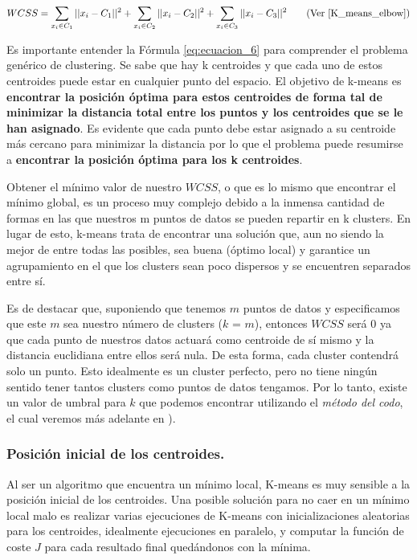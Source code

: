 \documentclass[12pt,a4paper]{article}
\begin{document}
\begin{sloppypar}
\begin{equation}\label{eq:ecuacion_7}
WCSS =  \sum_{x_{i} \in C_{1}}||x_{i}-C_{1}||^2 + \sum_{x_{i} \in C_{2}}||x_{i}-C_{2}||^2 + \sum_{x_{i} \in C_{3}}||x_{i}-C_{3}||^2     \qquad  \text{(Ver \cite{K_means_elbow})}
\end{equation}

\cleardoublepage
Es importante entender la Fórmula \ref{eq:ecuacion_6} para comprender el problema genérico de clustering. Se sabe que hay k centroides y que cada uno de estos centroides puede estar en cualquier punto del espacio. El objetivo de k-means es \textbf{encontrar la posición óptima para estos centroides de forma tal de minimizar la distancia total entre los puntos y los centroides que se le han asignado}. Es evidente que cada punto debe estar asignado a su centroide más cercano para minimizar la distancia por lo que el problema puede resumirse a \textbf{encontrar la posición óptima para los k centroides}.

Obtener el mínimo valor de nuestro $WCSS$, o que es lo mismo que encontrar el mínimo global, es un proceso muy complejo debido a la inmensa cantidad de formas en las que nuestros m puntos de datos se pueden repartir en k clusters. En lugar de esto, k-means trata de encontrar una solución que, aun no siendo la mejor de entre todas las posibles, sea buena (óptimo local) y garantice un agrupamiento en el que los clusters sean poco dispersos y se encuentren separados entre sí.

Es de destacar que, suponiendo que tenemos $m$ puntos de datos y especificamos que este $m$ sea nuestro número de clusters ($k$ = $m$), entonces $WCSS$ será 0 ya que cada punto de nuestros datos actuará como centroide de sí mismo y la distancia euclidiana entre ellos será nula. De esta forma, cada cluster contendrá solo un punto. Esto idealmente es un cluster perfecto, pero no tiene ningún sentido tener tantos clusters como puntos de datos tengamos. Por lo tanto, existe un valor de umbral para $k$ que podemos encontrar utilizando el \textit{método del codo}, el cual veremos más adelante en \textit{}).

\subsubsection{Posición inicial de los centroides.}\label{Posicion inicial centroides}

Al ser un algoritmo que encuentra un mínimo local, K-means es muy sensible a la posición inicial de los centroides. Una posible solución para no caer en un mínimo local malo es realizar varias ejecuciones de K-means con inicializaciones aleatorias para los centroides, idealmente ejecuciones en paralelo, y computar la función de coste $J$ para cada resultado final quedándonos con la mínima. 


\end{sloppypar}
\end{document}

